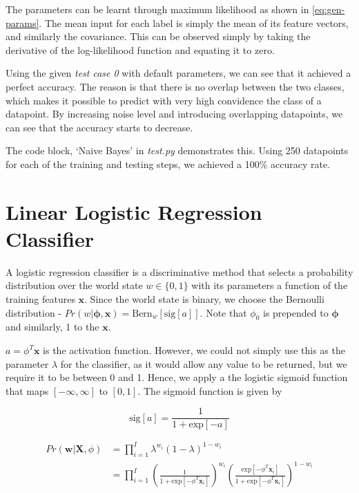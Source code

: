 \documentclass[11pt,openright,a4paper]{article}
\numberwithin{equation}{section}
\begin{document}
The parameters can be learnt through maximum likelihood as shown in \autoref{eq:gen-params}. The mean input for each label is simply the mean of its feature vectors, and similarly the covariance. This can be observed simply by taking the derivative of the log-likelihood function and equating it to zero.



Using the given \textit{test case 0} with default parameters, we can see that it achieved a perfect accuracy. The reason is that there is no overlap between the two classes, which makes it possible to predict with very high convidence the class of a datapoint. By increasing noise level and introducing overlapping datapoints, we can see that the accuracy starts to decrease. 

The code block, `Naive Bayes' in \textit{test.py} demonstrates this. Using 250 datapoints for each of the training and testing steps, we achieved a 100\% accuracy rate.


\section{Linear Logistic Regression Classifier} \label{sec:lr}
A logistic regression classifier is a discriminative method that selects a probability distribution over the world state $w \in \{0,1\}$ with its parameters a function of the training features $\mathbf{x}$. Since the world state is binary, we choose the Bernoulli distribution - $Pr(w | \boldsymbol{\phi}, \mathbf{x}) = \text{Bern}_w [\text{sig}[a]]$. Note that $\phi_0$ is prepended to $\boldsymbol{\phi}$ and similarly, 1 to the $\mathbf{x}$.

$a = \phi^T\mathbf{x}$ is the activation function. However, we could not simply use this as the parameter $\lambda$ for the classifier, as it would allow any value to be returned, but we require it to be between 0 and 1. Hence, we apply a the logistic sigmoid function that maps $[-\infty, \infty]$ to $[0, 1]$. The sigmoid function is given by 

\begin{equation} \label{eq:lr-sig}
    \text{sig} \left [ a \right ] = \frac{1}{1 + \text{exp} \left [ -a \right ] }
\end{equation}

\begin{equation} \label{eq:lr-prob}
    \begin{aligned}
        Pr \left ( \mathbf{w} | \mathbf{X}, \phi \right ) &= 
            \prod_{i=1}^{I} \lambda^{w_i} \left (1-\lambda \right )^{1-w_i}
        \\
        &= \prod_{i=1}^{I} 
            \left ( 
                \frac{1}
                     {1 + \text{exp} \left [ -\phi^{T} \mathbf{x}_i \right ]}  
            \right )^{w_i}
            \left ( \frac{\text{exp} \left [ -\phi^{T} \mathbf{x}_i \right ]}
                         {1 + \text{exp} \left [ -\phi^{T} \mathbf{x}_i \right ]} 
            \right )^{1-w_i}
    \end{aligned}
\end{equation}
\end{document}
